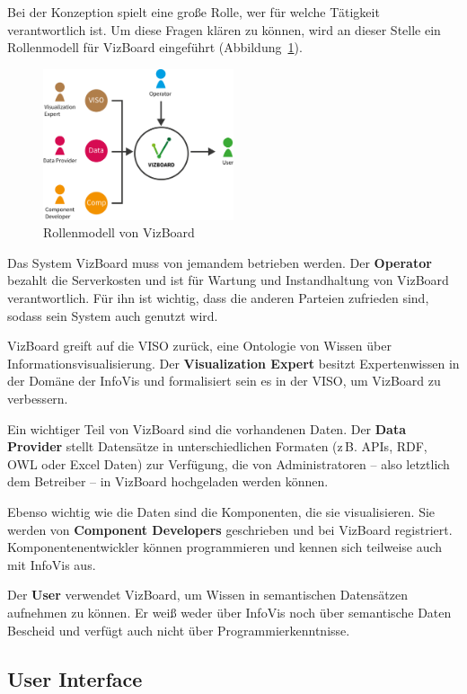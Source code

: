 \documentclass[
	headsepline,
	footsepline,
	fontsize=12pt,
	bibliography=totoc
]{scrbook}
\begin{document}
Bei der Konzeption spielt eine große Rolle, wer für welche Tätigkeit verantwortlich ist. Um diese Fragen klären zu können, wird an dieser Stelle ein Rollenmodell für VizBoard eingeführt (Abbildung~\ref{figure:rollenmodell}).

\begin{figure}[htbp]
   \centering
   \includegraphics[width=0.5\textwidth]{images/konzeption-rollenmodell.png}
   \caption{Rollenmodell von VizBoard}
   \label{figure:rollenmodell}
\end{figure}

Das System VizBoard muss von jemandem betrieben werden. Der \textbf{Operator} bezahlt die Serverkosten und ist für Wartung und Instandhaltung von VizBoard verantwortlich. Für ihn ist wichtig, dass die anderen Parteien zufrieden sind, sodass sein System auch genutzt wird.

VizBoard greift auf die VISO zurück, eine Ontologie von Wissen über Informationsvisualisierung. Der \textbf{Visualization Expert} besitzt Expertenwissen in der Domäne der InfoVis und formalisiert sein es in der VISO, um VizBoard zu verbessern.

Ein wichtiger Teil von VizBoard sind die vorhandenen Daten. Der \textbf{Data Provider} stellt Datensätze in unterschiedlichen Formaten (z\,B. APIs, RDF, OWL oder Excel Daten) zur Verfügung, die von Administratoren -- also letztlich dem Betreiber -- in VizBoard hochgeladen werden können.

Ebenso wichtig wie die Daten sind die Komponenten, die sie visualisieren. Sie werden von \textbf{Component Developers} geschrieben und bei VizBoard registriert. Komponentenentwickler können programmieren und kennen sich teilweise auch mit InfoVis aus.

Der \textbf{User} verwendet VizBoard, um Wissen in semantischen Datensätzen aufnehmen zu können. Er weiß weder über InfoVis noch über semantische Daten Bescheid und verfügt auch nicht über Programmierkenntnisse.

\subsection{User Interface}
\label{section:konzeption:einfuehrung:ui}
\end{document}

